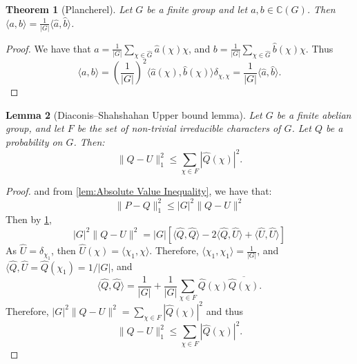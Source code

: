 \documentclass[]{article}
\newtheorem{theorem}{Theorem}
\newtheorem{lemma}[theorem]{Lemma}
\theoremstyle{definition}
\numberwithin{theorem}{section}
\numberwithin{equation}{section}
\begin{document}
\begin{theorem}[Plancherel]
	\label{thm:Plancherel}
	Let $G$ be a finite group and let $a, b \in \mathbb{C}(G)$. Then $\langle a, b \rangle = \frac{1}{|G|} \langle \widehat{a}, \widehat{b} \rangle$. 
\end{theorem}
\begin{proof}
	We have that $a =\frac{1}{|G|} \sum_{\chi \in \widehat{G}} \widehat{a}(\chi) \chi$, and $b = \frac{1}{|G|} \sum_{\chi \in \widehat{G}} \widehat{b}(\chi) \chi$. Thus \begin{equation}
		\langle a, b \rangle = \left(\frac{1}{|G|}\right)^2 \langle \widehat{a}(\chi), \widehat{b}(\chi) \rangle \delta_{\chi, \chi} = \frac{1}{|G|} \langle \widehat{a}, \widehat{b} \rangle.
	\end{equation}

\end{proof}

\begin{lemma}[Diaconis–Shahshahan Upper bound lemma]
	\label{lem:Upper bound lemma}
	Let $G$ be a finite abelian group, and let $F$ be the set of non-trivial irreducible characters of $G$. Let $Q$ be a probability on $G$.  Then:
	\begin{equation}
		\|Q - U\|^2_{1} \leq \sum_{\chi \in F} |\widehat{Q}(\chi)|^2.
	\end{equation}
\end{lemma}
\begin{proof}[Proof]

	and from \cref{lem:Absolute Value Inequality}, we have that:
	\begin{equation}
		 \| P - Q\|_1^2 \leq |G|^2 \| Q - U \|^2
	\end{equation}
	Then by \cref{thm:Plancherel},
	\begin{equation}
		|G|^2 \|Q - U \|^2 = |G| \left[ \langle \widehat{Q}, \widehat{Q} \rangle - 2 \langle \widehat{Q}, \widehat{U} \rangle + \langle \widehat{U}, \widehat{U} \rangle \right]
	\end{equation}
	As $\widehat{U} = \delta_{\chi_1}$, then $\widehat{U}(\chi) = \langle \chi_1, \chi \rangle$. 
	Therefore, $\langle \chi_1, \chi_1 \rangle = \frac{1}{|G|}$, and $\langle \widehat{Q}, \widehat{U} = \widehat{Q}(\chi_1) = 1/|G|$, and
	\begin{equation}
		\langle \widehat{Q}, \widehat{Q} \rangle =\frac{1}{|G|} + \frac{1}{|G|} \sum_{\chi \in F} \widehat{Q}(\chi) \overline{\widehat{Q}(\chi)}.
	\end{equation}
	Therefore, $|G|^2 \|Q - U \|^2 =  \sum_{\chi \in F}| \widehat{Q}(\chi)|^2$ and thus 
	\begin{equation}
		\|Q - U\|^2_{1} \leq \sum_{\chi \in F} |\widehat{Q}(\chi)|^2.
	\end{equation}
\end{proof}
\end{document}
